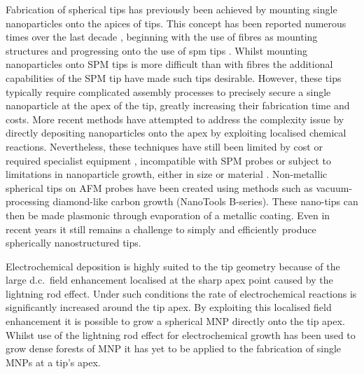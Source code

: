 \documentclass[12pt, a4paper, oneside]{book}
\begin{document}
Fabrication of spherical tips has previously been achieved by mounting single nanoparticles onto the apices of tips. This concept has been reported numerous times over the last decade \cite{gan2007}, beginning with the use of fibres as mounting structures \cite{kalkbrenner2001, barsegova2002, sqalli2002, kawata2003} and progressing onto the use of \gls{spm} tips \cite{umakoshi2012, hayazawa2012, park2012, okamoto2001, vakarelski2006}. Whilst mounting nanoparticles onto SPM tips is more difficult than with fibres the additional capabilities of the SPM tip have made such tips desirable. However, these tips typically require complicated assembly processes to precisely secure a single nanoparticle at the apex of the tip, greatly increasing their fabrication time and costs. More recent methods have attempted to address the complexity issue by directly depositing nanoparticles onto the apex by exploiting localised chemical reactions. Nevertheless, these techniques have still been limited by cost or required specialist equipment \cite{sqalli2002, okamoto2001}, incompatible with SPM probes \cite{kharintsev2013, barsegova2002} or subject to limitations in nanoparticle growth, either in size \cite{cheng2013} or material \cite{umakoshi2012}.
Non-metallic spherical tips on AFM probes have been created using methods such as vacuum-processing diamond-like carbon growth (NanoTools B-series). These nano-tips can then be made plasmonic through evaporation of a metallic coating.
Even in recent years it still remains a challenge to simply and efficiently produce spherically nanostructured tips.

Electrochemical deposition is highly suited to the tip geometry because of the large d.c.\ field enhancement localised at the sharp apex point caused by the lightning rod effect.
Under such conditions the rate of electrochemical reactions is significantly increased around the tip apex. By exploiting this localised field enhancement it is possible to grow a spherical MNP directly onto the tip apex. Whilst use of the lightning rod effect for electrochemical growth has been used to grow dense forests of MNP \cite{tian2006, yang2011} it has yet to be applied to the fabrication of single MNPs at a tip's apex.
\end{document}
